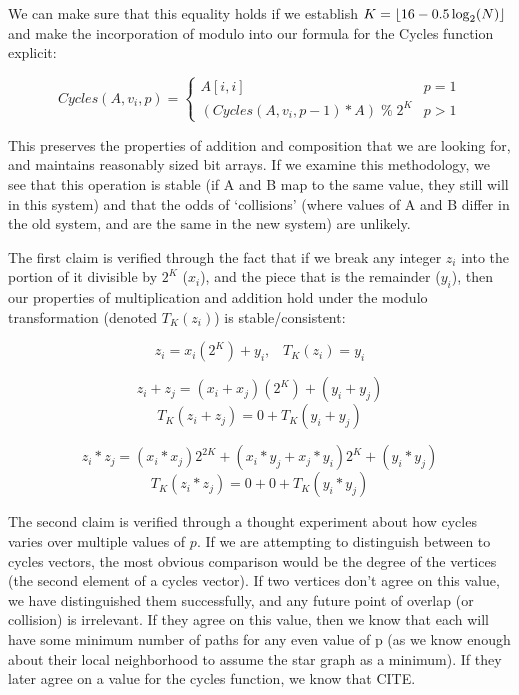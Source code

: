 \documentclass[11pt,a4paper]{report}
\DeclarePairedDelimiter\floor{\lfloor}{\rfloor}
\begin{document}
We can make sure that this equality holds if we establish $K = \floor{16 - 0.5\log_2(N)}$ and make the incorporation of modulo into our formula for the Cycles function explicit:

$$ Cycles(A, v_i, p) = \begin{cases} 
      A[i,i] & p = 1 \\
      (Cycles(A, v_i, p-1) * A) \; \% \; 2^K  & p > 1
\end{cases}$$

This preserves the properties of addition and composition that we are looking for, and maintains reasonably sized bit arrays.
If we examine this methodology, we see that this operation is stable (if A and B map to the same value, they still will in this system) and that the odds of `collisions' (where values of A and B differ in the old system, and are the same in the new system) are unlikely.

The first claim is verified through the fact that if we break any integer $z_i$ into the portion of it divisible by $2^K$ ($x_i$), and the piece that is the remainder ($y_i$), then our properties of multiplication and addition hold under the modulo transformation (denoted $T_K(z_i)$) is stable/consistent:

$$z_i =  x_i(2^K) + y_i , \;\;\;T_K(z_i) = y_i$$

$$z_i + z_j = (x_i + x_j)(2^K) + (y_i + y_j)$$
$$T_K(z_i + z_j) = 0 + T_K(y_i + y_j)$$

$$z_i * z_j = (x_i*x_j)2^{2K} + (x_i*y_j + x_j*y_i)2^K + (y_i * y_j)$$
$$T_K(z_i * z_j) = 0 + 0 + T_K(y_i * y_j)$$

The second claim is verified through a thought experiment about how cycles varies over multiple values of $p$.
If we are attempting to distinguish between to cycles vectors, the most obvious comparison would be the degree of the vertices (the second element of a cycles vector).
If two vertices don't agree on this value, we have distinguished them successfully, and any future point of overlap (or collision) is irrelevant. 
If they agree on this value, then we know that each will have some minimum number of paths for any even value of p (as we know enough about their local neighborhood to assume the star graph as a minimum). 
If they later agree on a value for the cycles function, we know that CITE.
\end{document}
